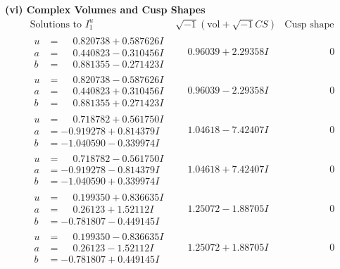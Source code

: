 \documentclass[1p]{elsarticle_modified}
\theoremstyle{definition}
\newcommand{\I}{\sqrt{-1}}
\begin{document}
\newpage\flushleft \textbf{(vi) Complex Volumes and Cusp Shapes}
$$\begin{array}{c|c|c}  
\text{Solutions to }I^u_{1}& \I (\text{vol} + \sqrt{-1}CS) & \text{Cusp shape}\\
 \hline 
\begin{aligned}
u &= \phantom{-}0.820738 + 0.587626 I \\
a &= \phantom{-}0.440823 - 0.310456 I \\
b &= \phantom{-}0.881355 - 0.271423 I\end{aligned}
 & \phantom{-}0.96039 + 2.29358 I & \phantom{-0.000000 } 0 \\ \hline\begin{aligned}
u &= \phantom{-}0.820738 - 0.587626 I \\
a &= \phantom{-}0.440823 + 0.310456 I \\
b &= \phantom{-}0.881355 + 0.271423 I\end{aligned}
 & \phantom{-}0.96039 - 2.29358 I & \phantom{-0.000000 } 0 \\ \hline\begin{aligned}
u &= \phantom{-}0.718782 + 0.561750 I \\
a &= -0.919278 + 0.814379 I \\
b &= -1.040590 - 0.339974 I\end{aligned}
 & \phantom{-}1.04618 - 7.42407 I & \phantom{-0.000000 } 0 \\ \hline\begin{aligned}
u &= \phantom{-}0.718782 - 0.561750 I \\
a &= -0.919278 - 0.814379 I \\
b &= -1.040590 + 0.339974 I\end{aligned}
 & \phantom{-}1.04618 + 7.42407 I & \phantom{-0.000000 } 0 \\ \hline\begin{aligned}
u &= \phantom{-}0.199350 + 0.836635 I \\
a &= \phantom{-}0.26123 + 1.52112 I \\
b &= -0.781807 - 0.449145 I\end{aligned}
 & \phantom{-}1.25072 - 1.88705 I & \phantom{-0.000000 } 0 \\ \hline\begin{aligned}
u &= \phantom{-}0.199350 - 0.836635 I \\
a &= \phantom{-}0.26123 - 1.52112 I \\
b &= -0.781807 + 0.449145 I\end{aligned}
 & \phantom{-}1.25072 + 1.88705 I & \phantom{-0.000000 } 0 \\ \hline\begin{aligned}

\end{aligned}
\end{array}$$
\end{document}
